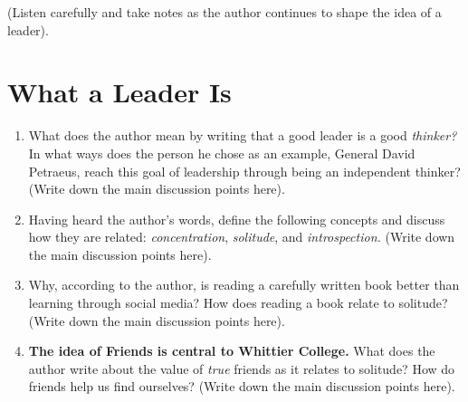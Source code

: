 \documentclass{article}
\begin{document}
(Listen carefully and take notes as the author continues to shape the idea of a leader). \\ \vspace{1cm}

\section{What a Leader Is}

\begin{enumerate}
\item What does the author mean by writing that a good leader is a good \textit{thinker?}  In what ways does the person he chose as an example, General David Petraeus, reach this goal of leadership through being an independent thinker?  (Write down the main discussion points here). \\ \vspace{2.5cm}
\item Having heard the author's words, define the following concepts and discuss how they are related: \textit{concentration}, \textit{solitude}, and \textit{introspection.} (Write down the main discussion points here). \\ \vspace{3cm}
\item Why, according to the author, is reading a carefully written book better than learning through social media? How does reading a book relate to solitude?  (Write down the main discussion points here).  \\ \vspace{3cm}
\item \textbf{The idea of Friends is central to Whittier College.}  What does the author write about the value of \textit{true} friends as it relates to solitude?  How do friends help us find ourselves? (Write down the main discussion points here). \\ \vspace{3cm}
\end{enumerate}
\end{document}
